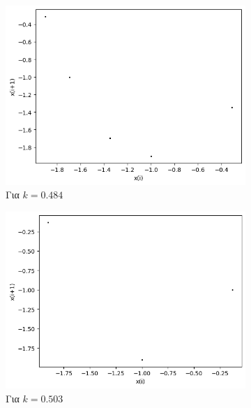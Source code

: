 \begin{figure}[ht]
\begin{subfigure}[b]{0.4\textwidth}
		\includegraphics[width=\textwidth]{LateX images/graphs q19/g5}
		\caption{Για $k=0.484$}
		\label{f:k94}
	\end{subfigure}
	\hfill
	\begin{subfigure}[b]{0.4\textwidth}
		\centering
		\includegraphics[width=\textwidth]{LateX images/graphs q19/g6}
		\caption{Για $k=0.503$}
		\label{f:k95}
	\end{subfigure}
	\hfill
	\begin{subfigure}[b]{0.4\textwidth}
		\centering

\end{subfigure}
\end{figure}
